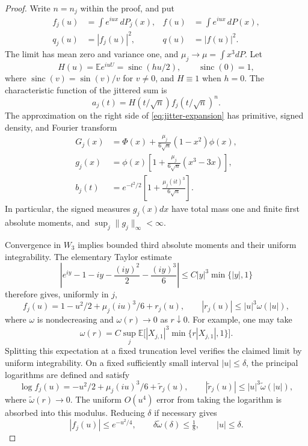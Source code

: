 \documentclass[aop]{imsart}
\theoremstyle{plain}
\theoremstyle{definition}
\theoremstyle{definition}
\newcommand{\EE}{\mathbb E}
\DeclareMathOperator{\sinc}{sinc}
\begin{document}
\begin{proof}
Write \(n=n_j\) within the proof, and put
\[
\begin{aligned}
 f_j(u)&=\int e^{iux}\,dP_j(x),&
 f(u)&=\int e^{iux}\,dP(x),\\
 q_j(u)&=|f_j(u)|^2,& q(u)&=|f(u)|^2.
\end{aligned}
\]
The limit has mean zero and variance one, and \(\mu_j\to\mu=\int x^3dP\).
Let
\[
 H(u)=\EE e^{iuU}=\sinc(hu/2),\qquad \sinc(0)=1,
\]
where \(\sinc(v)=\sin(v)/v\) for \(v\ne0\), and \(H\equiv1\) when \(h=0\).  The characteristic function of the
jittered sum is
\[
 a_j(t)=H(t/\sqrt n)f_j(t/\sqrt n)^n.
\]
The approximation on the right side of \eqref{eq:jitter-expansion} has
primitive, signed density, and Fourier transform
\[
 \begin{split}
 G_j(x)&=\Phi(x)+\frac{\mu_j}{6\sqrt n}(1-x^2)\phi(x),\\
 g_j(x)&=\phi(x)\left[1+\frac{\mu_j}{6\sqrt n}(x^3-3x)\right],\\
 b_j(t)&=e^{-t^2/2}\left[1+\frac{\mu_j(it)^3}{6\sqrt n}\right].
 \end{split}
\]
In particular, the signed measures \(g_j(x)dx\) have total mass one and
finite first absolute moments, and \(\sup_j\|g_j\|_\infty<\infty\).

Convergence in \(W_3\) implies bounded third absolute moments and their
uniform integrability.  The elementary Taylor estimate
\[
 \left|e^{iy}-1-iy-\frac{(iy)^2}{2}-\frac{(iy)^3}{6}\right|
 \le C|y|^3\min\{|y|,1\}
\]
therefore gives, uniformly in \(j\),
\[
 f_j(u)=1-u^2/2+\mu_j(iu)^3/6+r_j(u),
 \qquad |r_j(u)|\le |u|^3\omega(|u|),
\]
where \(\omega\) is nondecreasing and \(\omega(r)\to0\) as \(r\downarrow0\).
For example, one may take
\[
 \omega(r)=C\sup_j\EE\bigl[|X_{j,1}|^3
                                  \min\{r|X_{j,1}|,1\}\bigr].
\]
Splitting this expectation at a fixed truncation level verifies the claimed
limit by uniform integrability.  On a fixed sufficiently small interval
\(|u|\le\delta\), the principal logarithms are defined and satisfy
\[
 \log f_j(u)=-u^2/2+\mu_j(iu)^3/6+\widetilde r_j(u),
 \qquad
 |\widetilde r_j(u)|\le |u|^3\widetilde\omega(|u|),
\]
where \(\widetilde\omega(r)\to0\).  The uniform \(O(u^4)\) error from
taking the logarithm is absorbed into this modulus.  Reducing \(\delta\)
if necessary gives
\[
 |f_j(u)|\le e^{-u^2/4},\qquad
 \delta\widetilde\omega(\delta)\le\tfrac18,
 \qquad |u|\le\delta.
\]


\end{proof}
\end{document}
